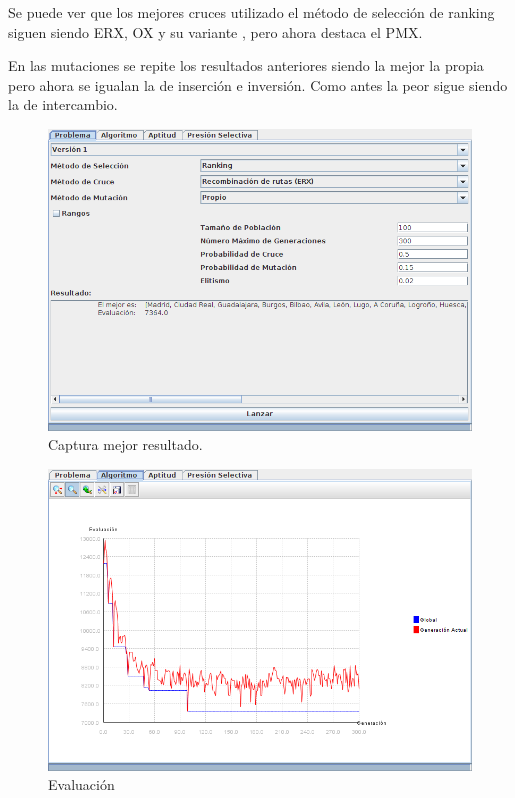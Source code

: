 \documentclass[12pt]{article}
\begin{document}
	Se puede ver que los mejores cruces utilizado el método de selección de ranking siguen siendo ERX, OX y su variante , pero ahora destaca el PMX.

	En las mutaciones se repite los resultados anteriores siendo la mejor la propia pero ahora se igualan la de inserción e inversión. Como antes la peor sigue siendo la de intercambio.

\begin{figure}[H]
\centering
\includegraphics[scale=0.4]{graficas/fig2}
\caption{Captura mejor resultado.}
\label{fig}
\end{figure}

\begin{figure}[H]
\centering
\includegraphics[scale=0.4]{graficas/fig2graf}
\caption{Evaluación}
\label{fig}
\end{figure}   
\end{document}
